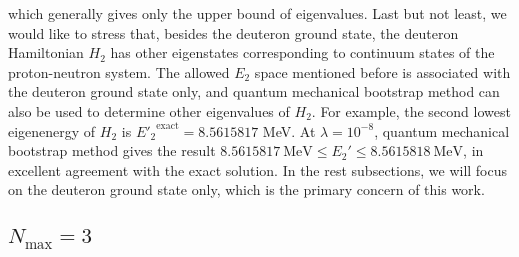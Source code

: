 \documentclass[aps,prc,reprint,superscriptaddress,nofootinbib]{revtex4-2}
\begin{document}
\begin{widetext}
which generally gives only the upper bound of eigenvalues.
Last but not least, we would like to stress that, besides the deuteron ground state, the deuteron Hamiltonian $H_2$ has other eigenstates corresponding to continuum states of the proton-neutron system.
 The allowed $E_2$ space mentioned before is associated with the deuteron ground state only,
 and quantum mechanical bootstrap method can also be used to determine other eigenvalues of $H_2$.
 For example, the second lowest eigenenergy of $H_2$ is ${E'_2}^{\text{exact}}=8.5615817$ MeV.
 At $\lambda=10^{-8}$, quantum mechanical bootstrap method gives the result $8.5615817\ \text{MeV}\leq E_2'\leq8.5615818\ \text{MeV}$,
 in excellent agreement with the exact solution.
 In the rest subsections, we will focus on the deuteron ground state only,
 which is the primary concern of this work.

\subsection{$N_\text{max}=3$}


\end{widetext}
\end{document}
